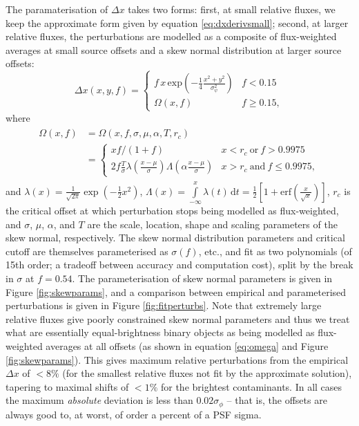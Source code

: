 \documentclass[fleqn,usenatbib]{mnras}
\begin{document}
The paramaterisation of $\Delta x$ takes two forms: first, at small relative fluxes, we keep the approximate form given by equation \ref{eq:dxderivsmall}; second, at larger relative fluxes, the perturbations are modelled as a composite of flux-weighted averages at small source offsets and a skew normal distribution at larger source offsets:
\begin{equation}
    \Delta x(x, y, f) =
    \begin{cases}
    f\,x\,\mathrm{exp}\left(-\frac{1}{4}\frac{x^2 + y^2}{\sigma_\psi^2}\right) & f < 0.15\\
    \Omega(x, f) & f \geq 0.15,
    \end{cases}
\label{eq:deltaxparam}
\end{equation}
where
\begin{align}
\begin{split}
    \Omega(x, f) &= \Omega(x, f, \sigma, \mu, \alpha, T, r_c) \\&=
    \begin{cases}
    x f/(1 + f) & x < r_c\ \mathrm{or}\ f > 0.9975 \\
    2 f \frac{T}{\sigma}\lambda\left(\frac{x - \mu}{\sigma}\right)\Lambda\left(\alpha\frac{x - \mu}{\sigma}\right) & x > r_c\ \mathrm{and}\ f \leq 0.9975,
    \end{cases}
\label{eq:omega}
\end{split}
\end{align}
and $\lambda(x) = \frac{1}{\sqrt{2\pi}}\exp\left(-\frac{1}{2} x^2\right)$, $\Lambda(x) = \int\limits_{-\infty}^x\lambda(t)\,\mathrm{d}t = \frac{1}{2}\left[1 + \mathrm{erf}\left(\frac{x}{\sqrt{x}}\right)\right]$, $r_c$ is the critical offset at which perturbation stops being modelled as flux-weighted, and $\sigma$, $\mu$, $\alpha$, and $T$ are the scale, location, shape and scaling parameters of the skew normal, respectively. The skew normal distribution parameters and critical cutoff are themselves parameterised as $\sigma(f)$, etc., and fit as two polynomials (of 15th order; a tradeoff between accuracy and computation cost), split by the break in $\sigma$ at $f=0.54$. The parameterisation of skew normal parameters is given in Figure \ref{fig:skewparams}, and a comparison between empirical and parameterised perturbations is given in Figure \ref{fig:fitperturbs}. Note that extremely large relative fluxes give poorly constrained skew normal parameters and thus we treat what are essentially equal-brightness binary objects as being modelled as flux-weighted averages at all offsets (as shown in equation \ref{eq:omega} and Figure \ref{fig:skewparams}). This gives maximum relative perturbations from the empirical $\Delta x$ of $<8\%$ (for the smallest relative fluxes not fit by the approximate solution), tapering to maximal shifts of $<1\%$ for the brightest contaminants. In all cases the maximum \textit{absolute} deviation is less than $0.02\sigma_\phi$ -- that is, the offsets are always good to, at worst, of order a percent of a PSF sigma.
\end{document}
